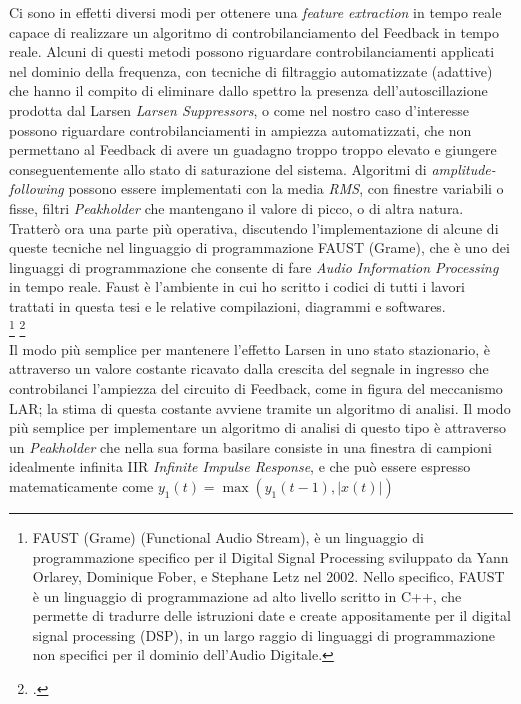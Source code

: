 Ci sono in effetti diversi modi per ottenere una \textit{feature extraction} 
in tempo reale capace di realizzare un algoritmo di controbilanciamento 
del Feedback in tempo reale.
Alcuni di questi metodi possono riguardare controbilanciamenti 
applicati nel dominio della frequenza,
con tecniche di filtraggio automatizzate (adattive) che
hanno il compito di eliminare dallo spettro la presenza dell'autoscillazione prodotta dal Larsen \textit{Larsen Suppressors},
o come nel nostro caso d’interesse possono riguardare controbilanciamenti in ampiezza
automatizzati, che non permettano al Feedback di avere un guadagno troppo troppo elevato 
e giungere conseguentemente allo stato di saturazione del sistema.
Algoritmi di \textit{amplitude-following} possono essere implementati 
con la media \textit{RMS}, con finestre variabili o fisse, 
filtri \textit{Peakholder} che mantengano il valore di picco, o di altra natura. \\
Tratterò ora  una parte più operativa, discutendo l'implementazione
di alcune di queste tecniche nel linguaggio di programmazione FAUST (Grame), 
che è uno dei linguaggi di programmazione
che consente di fare \textit{Audio Information Processing} in tempo reale.
Faust è l'ambiente in cui ho scritto i codici di tutti i lavori trattati
in questa tesi e le relative compilazioni, diagrammi e softwares. \\
\footnote{FAUST (Grame) (Functional Audio Stream), 
è un linguaggio di programmazione specifico per il Digital Signal
Processing sviluppato da Yann Orlarey, Dominique Fober, e Stephane Letz nel
2002. Nello specifico, FAUST è un linguaggio di programmazione ad alto livello
scritto in C++, che permette di tradurre delle istruzioni date e create 
appositamente per il digital signal processing (DSP), in un largo raggio di linguaggi
di programmazione non specifici per il dominio dell’Audio Digitale.} \footcite{https://faust.grame.fr/} \\
Il modo più semplice per mantenere l’effetto Larsen in uno stato stazionario, è attraverso un
valore costante ricavato dalla crescita del segnale in ingresso 
che controbilanci l’ampiezza del circuito di Feedback, come in figura del meccanismo LAR;
la stima di questa costante avviene tramite un algoritmo di analisi.
Il modo più semplice per implementare un algoritmo di analisi di questo tipo
è attraverso un \textit{Peakholder} che nella sua forma basilare consiste in una finestra 
di campioni idealmente infinita IIR \textit{Infinite Impulse Response},
e che può essere espresso matematicamente come 
\( y_{1}(t) = \max\left( y_{1}(t\!-\!1), \left\lvert{x(t)}\right\rvert \right) \) 
